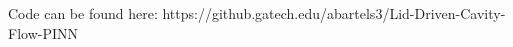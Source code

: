 \documentclass{article}
\begin{document}
%	

Code can be found here:
https://github.gatech.edu/abartels3/Lid-Driven-Cavity-Flow-PINN
\end{document}
